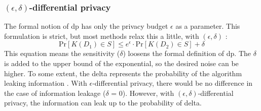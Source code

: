 \subsubsection{$(\epsilon, \delta)$-differential privacy}
The formal notion of \gls{dp} has only the privacy budget $\epsilon$ as a parameter.
This formulation is strict, but most methods relax this a little, with $(\epsilon, \delta)$ \citep{dwork_differential_2006}:
\begin{equation}
  {\mathrm{Pr}}[K(D_{1})\in S]\leq e^{\epsilon} \cdot {\mathrm{Pr}}[K(D_{2})\in S] + \delta
  \label{approxiate-dp}
\end{equation}
This equation means the sensitivity ($\delta$) loosens the formal definition of \gls{dp}.
The $\delta$ is added to the upper bound of the exponential, so the desired noise can be higher.
To some extent, the delta represents the probability of the algorithm leaking information \citep{aitsam_differential_2021}.
With $\epsilon$-differential privacy, there would be no difference in the case of information leakage ($\delta$ = 0).
However, with $(\epsilon, \delta)$-differential privacy, the information can leak up to the probability of delta.
\newpage
